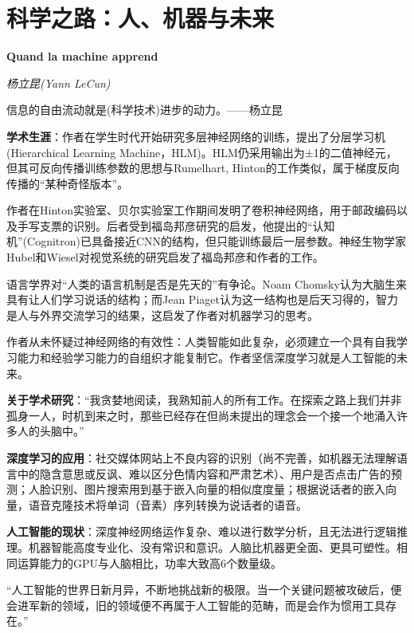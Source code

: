 \chapter{科学之路：人、机器与未来}
\Large\textbf{Quand la machine apprend}
\par \emph{杨立昆(Yann LeCun)} \normalsize

\par 信息的自由流动就是(科学技术)进步的动力。——杨立昆

\par \textbf{学术生涯}：作者在学生时代开始研究多层神经网络的训练，提出了分层学习机 (Hierarchical Learning Machine，HLM)。HLM仍采用输出为±1的二值神经元，但其可反向传播训练参数的思想与Rumelhart, Hinton的工作类似，属于梯度反向传播的“某种奇怪版本”。
\par 作者在Hinton实验室、贝尔实验室工作期间发明了卷积神经网络，用于邮政编码以及手写支票的识别。后者受到福岛邦彦研究的启发，他提出的“认知机”(Cognitron)已具备接近CNN的结构，但只能训练最后一层参数。神经生物学家Hubel和Wiesel对视觉系统的研究启发了福岛邦彦和作者的工作。
\par 语言学界对“人类的语言机制是否是先天的”有争论。Noam Chomsky认为大脑生来具有让人们学习说话的结构；而Jean Piaget认为这一结构也是后天习得的，智力是人与外界交流学习的结果，这启发了作者对机器学习的思考。
\par 作者从未怀疑过神经网络的有效性：人类智能如此复杂，必须建立一个具有自我学习能力和经验学习能力的自组织才能复制它。作者坚信深度学习就是人工智能的未来。

\par \textbf{关于学术研究}：“我贪婪地阅读，我熟知前人的所有工作。在探索之路上我们并非孤身一人，时机到来之时，那些已经存在但尚未提出的理念会一个接一个地涌入许多人的头脑中。”

\par \textbf{深度学习的应用}：社交媒体网站上不良内容的识别（尚不完善，如机器无法理解语言中的隐含意思或反讽、难以区分色情内容和严肃艺术）、用户是否点击广告的预测；人脸识别、图片搜索用到基于嵌入向量的相似度度量；根据说话者的嵌入向量，语音克隆技术将单词（音素）序列转换为说话者的语音。

\par \textbf{人工智能的现状}：深度神经网络运作复杂、难以进行数学分析，且无法进行逻辑推理。机器智能高度专业化、没有常识和意识。人脑比机器更全面、更具可塑性。相同运算能力的GPU与人脑相比，功率大致高6个数量级。
\par “人工智能的世界日新月异，不断地挑战新的极限。当一个关键问题被攻破后，便会进军新的领域，旧的领域便不再属于人工智能的范畴，而是会作为惯用工具存在。”

